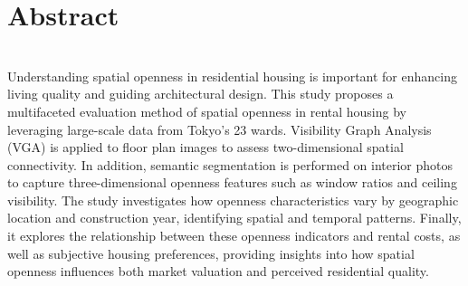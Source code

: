 \chapter*{Abstract}
\Huge
\begin{centering} 
\textbf{}
\end{centering}
\normalsize\\

Understanding  spatial  openness  in  residential  housing  is  important  for  enhancing  living  quality  and  guiding architectural design. 
This study proposes a multifaceted evaluation method of spatial openness in rental housing by leveraging large-scale data from Tokyo’s 23 wards. 
Visibility Graph Analysis (VGA) is applied to floor plan images  to  assess  two-dimensional  spatial  connectivity.  
In  addition,  semantic  segmentation  is  performed  on interior photos to capture three-dimensional openness features such as window ratios and ceiling visibility. 
The study investigates how openness characteristics vary by geographic location and construction year, identifying spatial  and  temporal  patterns.  
Finally,  it  explores  the  relationship  between  these  openness  indicators and rental costs, as well as subjective housing preferences, providing insights into how spatial openness influences both market valuation and perceived residential quality.


